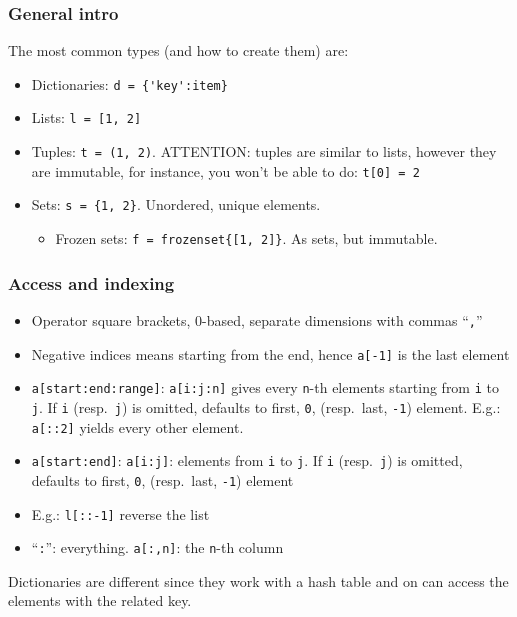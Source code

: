 \documentclass[a4paper,12pt,%
              final%
              ]{article}
\begin{document}
\subsubsection{General intro}
The most common types (and how to create them) are:
\begin{itemize}
  \item Dictionaries: \verb|d = {'key':item}|
  \item Lists: \verb|l = [1, 2]|
  \item Tuples: \verb|t = (1, 2)|. ATTENTION: tuples are similar to lists, however they are immutable, for instance, you won't be able to do: \verb|t[0] = 2|
  \item Sets: \verb|s = {1, 2}|. Unordered, unique elements.
    \begin{itemize}
      \item Frozen sets: \verb|f = frozenset{[1, 2]}|. As sets, but immutable.
    \end{itemize}
\end{itemize}

\subsubsection{Access and indexing}
\begin{itemize}
  \item Operator square brackets, 0-based, separate dimensions with commas ``\texttt{,}''
  \item Negative indices means starting from the end, hence \texttt{a[-1]} is the last element
  \item \verb|a[start:end:range]|: \verb|a[i:j:n]| gives every \texttt{n}-th elements starting from \texttt{i} to \texttt{j}. If \texttt{i} (resp.~\texttt{j}) is omitted, defaults to first, \texttt{0}, (resp.~last, \texttt{-1}) element. E.g.: \verb|a[::2]| yields every other element.
  \item \verb|a[start:end]|: \verb|a[i:j]|: elements from \texttt{i} to \texttt{j}. If \texttt{i} (resp.~\texttt{j}) is omitted, defaults to first, \texttt{0}, (resp.~last, \texttt{-1}) element
  \item E.g.: \verb|l[::-1]| reverse the list
  \item ``\verb|:|'': everything. \verb|a[:,n]|: the \texttt{n}-th column
\end{itemize}

Dictionaries are different since they work with a hash table and on can access the elements with the related key.
\end{document}
